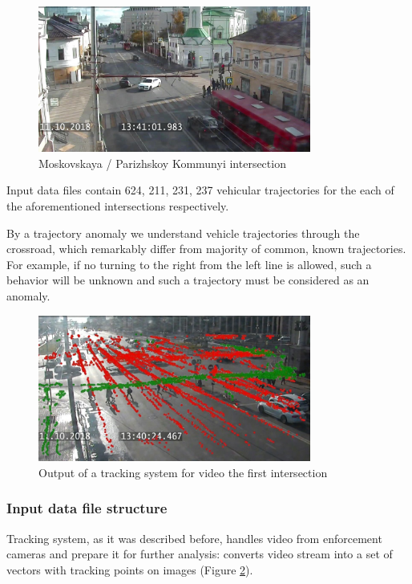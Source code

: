 \begin{figure}[!htb]
	\centering{}
	\includegraphics[width=0.8\textwidth]{images/is-4.jpg}
	\caption{Moskovskaya / Parizhskoy Kommunyi intersection}
	\label{fig:is_4}
\end{figure}

Input data files contain 624, 211, 231, 237 vehicular trajectories for the each of the aforementioned intersections respectively.

By a trajectory anomaly we understand vehicle trajectories through the crossroad, which remarkably differ from majority of common, known trajectories. For example, if no turning to the right from the left line is allowed, such a behavior will be unknown and such a trajectory must be considered as an anomaly.

\begin{figure}[!htb]
	\centering{}
	\includegraphics[width=0.8\textwidth]{images/tr-p.png}
	\caption{Output of a tracking system for video the first intersection}
	\label{fig:tr_p}
\end{figure}

\subsubsection{Input data file structure}
Tracking system, as it was described before, handles video from enforcement cameras and prepare it for further analysis: converts video stream into a set of vectors with tracking points on images (Figure \ref{fig:tr_p}).

